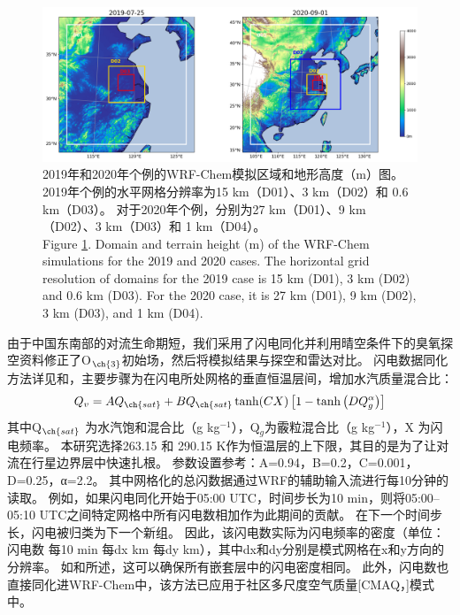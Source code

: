 \begin{figure}[H]
\centering
\includegraphics[width=\textwidth]{./figures/domains_china.png}
\caption{2019年和2020年个例的WRF-Chem模拟区域和地形高度（m）图。
2019年个例的水平网格分辨率为15 km（D01）、3 km（D02）和 0.6 km（D03）。
对于2020年个例，分别为27 km（D01）、9 km（D02）、3 km（D03）和 1 km（D04）。\\
Figure \ref{fig:domains_china}. Domain and terrain height (m) of the WRF-Chem simulations for the 2019 and 2020 cases. The horizontal grid resolution of
domains for the 2019 case is 15 km (D01), 3 km (D02) and 0.6 km (D03). For the 2020 case, it is 27 km (D01), 9 km (D02), 3 km (D03),
and 1 km (D04).}
\label{fig:domains_china}
\end{figure}

由于中国东南部的对流生命期短，我们采用了闪电同化并利用晴空条件下的臭氧探空资料修正了O$_{\ch{3}}$初始场，然后将模拟结果与探空和雷达对比。
闪电数据同化方法详见\citet{Fierro.2012}和\citet{Li.2017b}，主要步骤为在闪电所处网格的垂直恒温层间，增加水汽质量混合比：
\begin{equation} \label{eq:lda}
Q_{v}=A Q_{\ch{sat}}+B Q_{\ch{sat}} \tanh (C X)\left[1-\tanh \left(D Q_{g}^{\alpha}\right)\right]
\end{equation}
其中Q$_{\ch{sat}}$ 为水汽饱和混合比（g kg$^{−1}$），Q$_g$为霰粒混合比（g kg$^{−1}$），X 为闪电频率。
本研究选择263.15 和 290.15 K作为恒温层的上下限，其目的是为了让对流在行星边界层中快速扎根\citep{Marchand.2014,Finney.2016,Li.2017b}。
参数设置参考\citet{Li.2017b}：A=0.94，B=0.2，C=0.001，D=0.25，α=2.2。
其中网格化的总闪数据通过WRF的辅助输入流进行每10分钟的读取。
例如，如果闪电同化开始于05:00 UTC，时间步长为10 min，则将05:00--05:10 UTC之间特定网格中所有闪电数相加作为此期间的贡献。
在下一个时间步长，闪电被归类为下一个新组。
因此，该闪电数实际为闪电频率的密度（单位：闪电数 每10 min 每dx km 每dy km），其中dx和dy分别是模式网格在x和y方向的分辨率。
如\citet{Fierro.2012}和\citet{Li.2017b}所述，这可以确保所有嵌套层中的闪电密度相同。
此外，闪电数也直接同化进WRF-Chem中，该方法已应用于社区多尺度空气质量[CMAQ，\citet{Kang.2019a,Kang.2019,Kang.2020}]模式中。



